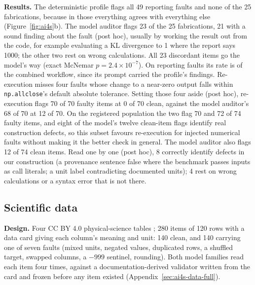\textbf{Results.} The deterministic profile flags all 49 reporting faults and none of the 25
fabrications, because in those everything agrees with everything else (Figure~\ref{fig:ai4s}b). The
model auditor flags 23 of the 25 fabrications, 21 with a sound finding about the fault (post hoc),
usually by working the result out from the code, for example evaluating a KL divergence to 1 where
the report says 1000; the other two rest on wrong calculations. All 23 discordant items go the model's
way (exact McNemar $p = 2.4\times10^{-7}$). On reporting faults its rate is of the combined workflow,
since its prompt carried the profile's findings. Re-execution misses four faults whose change
to a near-zero output falls within \texttt{np.allclose}'s default absolute tolerance. Setting those four aside (post hoc), re-execution flags 70 of 70 faulty items at 0 of 70 clean, against the model auditor's 68 of 70 at 12 of 70. On the registered population the two flag 70 and 72 of 74 faulty items, and eight of the model's twelve clean-item flags identify real construction defects, so this subset favours re-execution for injected numerical faults without making it the better check in general. The model auditor also flags 12 of 74 clean items. Read one by one (post hoc),
8 correctly identify defects in our construction (a provenance sentence false where the benchmark
passes inputs as call literals; a unit label contradicting documented units); 4 rest on wrong
calculations or a syntax error that is not there.

\subsection{Scientific data}
\label{sec:ai4s-data}

\textbf{Design.} Four CC BY 4.0 physical-science tables \citep{yeh1998concrete, brooks1989airfoil,
tufekci2014ccpp, hamidieh2018superconductor}; 280 items of 120 rows with a data card giving each
column's meaning and unit: 140 clean, and 140 carrying one of seven faults (mixed units, negated
values, duplicated rows, a shuffled target, swapped columns, a $-999$ sentinel, rounding). Both model
families read each item four times, against a documentation-derived validator written from the card and
frozen before any item existed (Appendix~\ref{sec:ai4s-data-full}).


